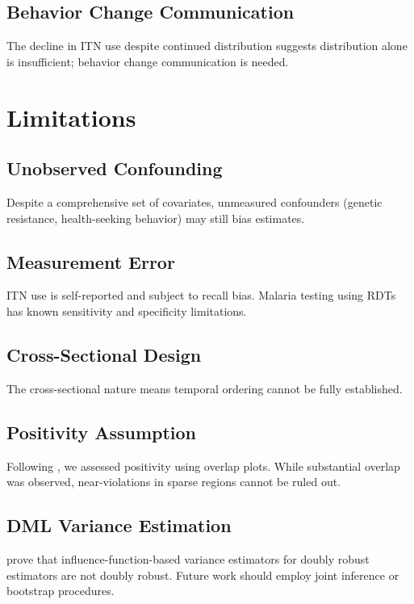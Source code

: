 \subsection{Behavior Change Communication}

The decline in ITN use despite continued distribution suggests distribution alone is insufficient; behavior change communication is needed.

\section{Limitations}

\subsection{Unobserved Confounding}

Despite a comprehensive set of covariates, unmeasured confounders (genetic resistance, health-seeking behavior) may still bias estimates.

\subsection{Measurement Error}

ITN use is self-reported and subject to recall bias. Malaria testing using RDTs has known sensitivity and specificity limitations.

\subsection{Cross-Sectional Design}

The cross-sectional nature means temporal ordering cannot be fully established.

\subsection{Positivity Assumption}

Following \citet{westreich2010invited}, we assessed positivity using overlap plots. While substantial overlap was observed, near-violations in sparse regions cannot be ruled out.

\subsection{DML Variance Estimation}

\citet{wu2025why} prove that influence-function-based variance estimators for doubly robust estimators are not doubly robust. Future work should employ joint inference or bootstrap procedures.

